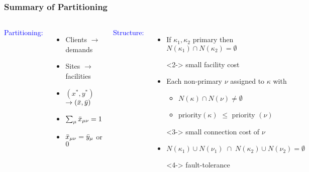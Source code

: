 \documentclass[hyperref,dvipsnames,svgnames,compress]{beamer}
\begin{document}

\begin{frame}
  \frametitle{Summary of Partitioning}

  \begin{columns}[T]
    \textcolor{blue}{Partitioning:}
    \begin{itemize}\addtolength{\itemsep}{0.5\baselineskip}
	\item Clients $\rightarrow$ demands
	\item Sites $\rightarrow$ facilities

	\item $(x^\ast,y^\ast)$ $\rightarrow ({\bar x},{\bar y})$
	\item $\sum_{\mu}{\bar x}_{\mu\nu} = 1$
	\item ${\bar x}_{\mu\nu} = {\bar y}_\mu$ or $0$
        \end{itemize}

    \textcolor{blue}{Structure:}
    \begin{itemize}

    \item If $\kappa_1,\kappa_2$ primary then
      $N(\kappa_1)\cap N(\kappa_2) = \emptyset$
    \begin{block}<2->{}
      small facility cost
    \end{block}
  \item Each non-primary $\nu$ assigned to $\kappa$ with
	\begin{itemize}
        \item $N(\kappa)\cap N(\nu) \neq \emptyset$
	\item priority$(\kappa)$ $\le$ priority $(\nu)$
        \end{itemize}
        \begin{block}<3->{}
          small connection cost of $\nu$
        \end{block}
  \item $N(\kappa_1) \cup N(\nu_1)\;\cap\;N(\kappa_2) \cup N(\nu_2) = \emptyset$
    \begin{block}<4->{}
      fault-tolerance
    \end{block}
  \end{itemize}
\end{columns}
\end{frame}
\end{document}
